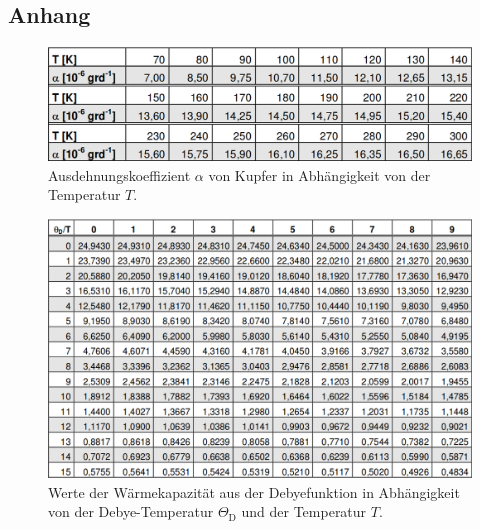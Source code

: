 \begin{appendix}


\section{Anhang}

\begin{figure}
  \centering
  \includegraphics[width=\textwidth]{ressources/alpha.png}
  \caption{Ausdehnungskoeffizient $\alpha$ von Kupfer in Abhängigkeit von der Temperatur $T$. \cite{skript}}
  \label{fig:alphaa}
\end{figure}

\begin{figure}
  \centering
  \includegraphics[width=\textwidth]{ressources/hugetable.png}
  \caption{Werte der Wärmekapazität aus der Debyefunktion in Abhängigkeit von der Debye-Temperatur $\Theta_\text{D}$ und der Temperatur $T$. \cite{skript}}
  \label{fig:mirfallenkeinelabelmehreinfuerdenganzenmistfuckthisshitimoutwarumtueichmirdasanundesistschonhalbzweinachtsdafuq}
\end{figure}
% 
% 
%
\end{appendix}
